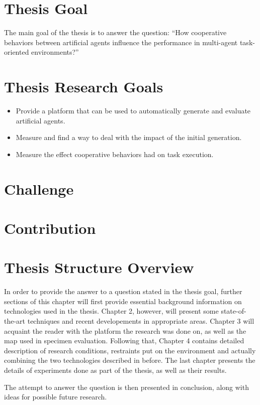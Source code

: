 \section{Thesis Goal}
The main goal of the thesis is to answer the question:
``How cooperative behaviors between artificial agents influence the performance in multi-agent task-oriented environments?''
\section{Thesis Research Goals}
\begin{itemize}
    \item Provide a platform that can be used to automatically generate and evaluate artificial agents.
    \item Measure and find a way to deal with the impact of the initial generation.   
    \item Measure the effect cooperative behaviors had on task execution.
\end{itemize}
\section{Challenge}
\section{Contribution} %
\section{Thesis Structure Overview}
In order to provide the answer to a question stated in the thesis goal, further sections of this chapter will first provide essential background information on technologies used in the thesis. Chapter 2, however, will present some state-of-the-art techniques and recent developements in appropriate areas. Chapter 3 will acquaint the reader with the platform the research was done on, as well as the map used in specimen evaluation. Following that, Chapter 4 contains detailed description of research conditions, restraints put on the environment and actually combining the two technologies described in before. The last chapter presents the details of experiments done as part of the thesis, as well as their results.

The attempt to answer the question is then presented in conclusion, along with ideas for possible future research.

